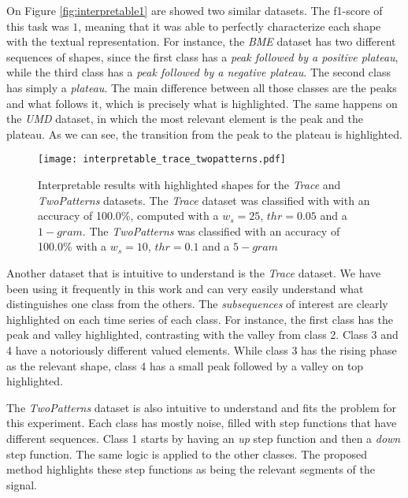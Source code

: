 On Figure \ref{fig:interpretable1} are showed two similar datasets. The f1-score of this task was $1$, meaning that it was able to perfectly characterize each shape with the textual representation. For instance, the \textit{BME} dataset has two different sequences of shapes, since the first class has a \textit{peak followed by a positive plateau}, while the third class has a \textit{peak followed by a negative plateau}. The second class has simply a \textit{plateau}. The main difference between all those classes are the peaks and what follows it, which is precisely what is highlighted. The same happens on the \textit{UMD} dataset, in which the most relevant element is the peak and the plateau. As we can see, the transition from the peak to the plateau is highlighted.

\begin{figure}[h]
    \centering
    \texttt{[image: interpretable\_trace\_twopatterns.pdf]}
    \caption{Interpretable results with highlighted shapes for the \textit{Trace} and \textit{TwoPatterns} datasets. The \textit{Trace} dataset was classified with with an accuracy of 100.0\%, computed with a $w_s=25$, $thr=0.05$ and a $1-gram$. The \textit{TwoPatterns} was classified with an accuracy of 100.0\% with a $w_s=10$, $thr=0.1$ and a $5-gram$}
    \label{fig:interpretable2}
\end{figure}

Another dataset that is intuitive to understand is the \textit{Trace} dataset. We have been using it frequently in this work and can very easily understand what distinguishes one class from the others. The \textit{subsequences} of interest are clearly highlighted on each time series of each class. For instance, the first class has the peak and valley highlighted, contrasting with the valley from class 2. Class 3 and 4 have a notoriously different valued elements. While class 3 has the rising phase as the relevant shape, class 4 has a small peak followed by a valley on top highlighted.
\par
The \textit{TwoPatterns} dataset is also intuitive to understand and fits the problem for this experiment. Each class has mostly noise, filled with step functions that have different sequences. Class 1 starts by having an \textit{up} step function and then a \textit{down} step function. The same logic is applied to the other classes. The proposed method highlights these step functions as being the relevant segments of the signal.


